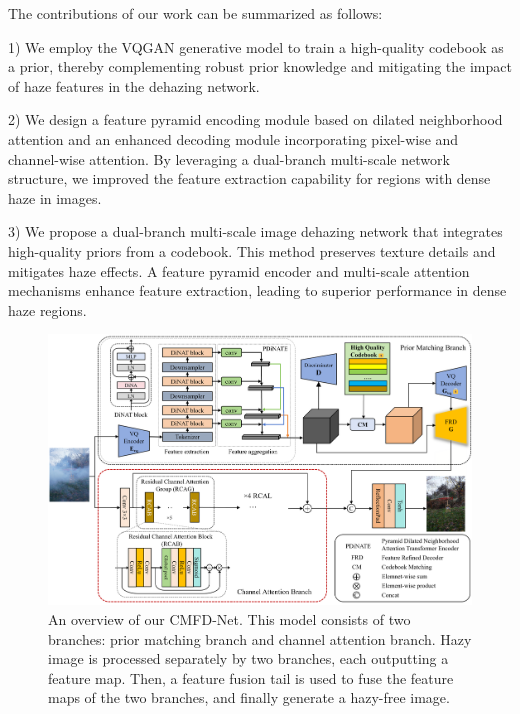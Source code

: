 \documentclass[journal]{IEEEtran}
\begin{document}
The contributions of our work can be summarized as follows:

\begin{list}{}{}
	\item{1) We employ the VQGAN generative model to train a high-quality codebook as a prior, thereby complementing robust prior knowledge and mitigating the impact of haze features in the dehazing network.}

	\item{2) We design a feature pyramid encoding module based on dilated neighborhood attention and an enhanced decoding module incorporating pixel-wise and channel-wise attention. By leveraging a dual-branch multi-scale network structure, we improved the feature extraction capability for regions with dense haze in images.}

	\item{3) We propose a dual-branch multi-scale image dehazing network that integrates high-quality priors from a codebook. This method preserves texture details and mitigates haze effects. A feature pyramid encoder and multi-scale attention mechanisms enhance feature extraction, leading to superior performance in dense haze regions.}
\end{list}

\begin{figure}[!t]
	\centering
	\includegraphics[width=7in]{images/network_architecture}
	\caption{An overview of our CMFD-Net. This model consists of two branches: prior matching branch and channel attention branch. Hazy image is processed separately by two branches, each outputting a feature map. Then, a feature fusion tail is used to fuse the feature maps of the two branches, and finally generate a hazy-free image.}
	\label{fig0}
\end{figure}
\end{document}
